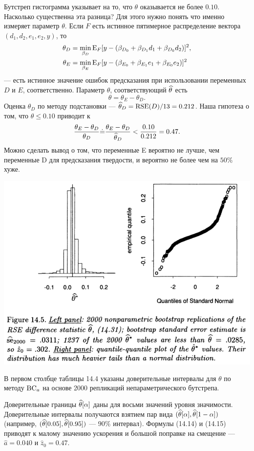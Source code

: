 Бутстреп гистограмма указывает на то, что $\theta$ оказывается не более $0.10$. Насколько существенна эта разница? Для этого нужно понять что именно измеряет параметр $\theta$.    Если $F$ есть истинное пятимерное распределение вектора $(d_1,d_2,e_1,e_2,y)$, то
\begin{align}
	\theta_D &= \min_{\beta_D} \text{E}_F [y - (\beta_{D_0} + \beta_{D_1}d_1 + \beta_{D_0}d_2)]^2, \notag\\
	\theta_E &= \min_{\beta_E} \text{E}_F [y - (\beta_{E_0} + \beta_{E_1}e_1 + \beta_{E_0}e_2)]^2
\end{align}
--- есть истинное значение ошибок предсказания при использовании переменных $D$ и $E$, соответственно. Параметр $\theta$, соответствующий $\widehat{\theta}$ есть
\begin{equation}
  \theta = \theta_E - \theta_D.
\end{equation}
Оценка $\theta_D$ по методу подстановки --- $\widehat{\theta}_D = \text{RSE}(D)/13 = 0.212$. Наша гипотеза о том, что $\theta \leqslant 0.10$ приводит к 
\begin{equation}
  \frac{\theta_E - \theta_D}{\theta_D} \dot = \frac{\theta_E - \theta_D}{\widehat{\theta}_D} < \frac{0.10}{0.212} = 0.47.
\end{equation}
Можно сделать вывод о том, что переменные E вероятно не лучше, чем переменные D для предсказания твердости, и вероятно не более чем на $50\%$ хуже.

\includegraphics[width=0.85\linewidth]{14/f145.png}
\newline

В первом столбце таблицы 14.4 указаны доверительные интервалы для $\theta$ по методу $\mathrm{BC}_a$ на основе 2000 репликаций непараметрического бутстрепа.

Доверительные границы $\widehat{\theta}[\alpha]$ даны для восьми значений уровня значимости. Доверительные интервалы получаются взятием пар вида $(\widehat{\theta}[\alpha], \widehat{\theta}[1-\alpha])$ (например, $(\widehat{\theta}[0.05], \widehat{\theta}[0.95])$ --- $90\%$ интервал). Формулы (14.14) и (14.15) приводят к малому значению ускорения и большой поправке на смещение --- $\hat a = 0.040$ и $\hat z_0 = 0.47$.

